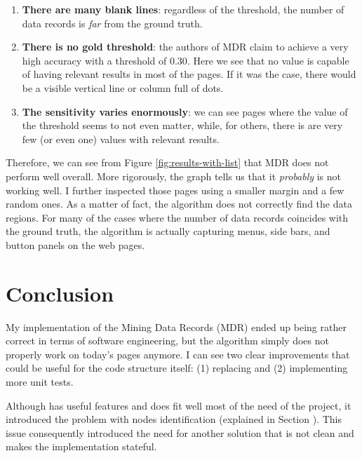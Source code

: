 \documentclass[10pt]{article}
\begin{document}
\begin{enumerate}
    
    \item \textbf{There are many blank lines}: regardless of the threshold, the number of data records is \emph{far} from the ground truth.
    
    \item \textbf{There is no gold threshold}: the authors of MDR claim to achieve a very high accuracy with a threshold of $0.30$. Here we see that no value is capable of having relevant results in most of the pages. If it was the case, there would be a visible vertical line or column full of dots.
    
    \item \textbf{The sensitivity varies enormously}: we can see pages where the value of the threshold seems to not even matter, while, for others, there is are very few (or even one) values with relevant results. 
    
\end{enumerate}

Therefore, we can see from Figure \ref{fig:results-with-list} that MDR does not perform well overall. More rigorously, the graph tells us that it \emph{probably} is not working well. I further inspected those pages using a smaller margin and a few random ones. As a matter of fact, the algorithm does not correctly find the data regions. For many of the cases where the number of data records coincides with the ground truth, the algorithm is actually capturing menus, side bars, and button panels on the web pages.



\section{Conclusion}

My implementation of the Mining Data Records (MDR) ended up being rather correct in terms of software engineering, but the algorithm simply does not properly work on today's pages anymore. I can see two clear improvements that could be useful for the code structure itself: (1) replacing  and (2) implementing more unit tests. 

Although  has useful features and does fit well most of the need of the project, it introduced the problem with nodes identification (explained in Section ). This issue consequently introduced the need for another solution that is not clean and makes the implementation stateful.
\end{document}
